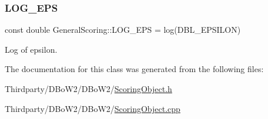 \subsubsection{\texorpdfstring{L\+O\+G\+\_\+\+E\+PS}{LOG\_EPS}}
{\footnotesize\ttfamily const double General\+Scoring\+::\+L\+O\+G\+\_\+\+E\+PS = log(D\+B\+L\+\_\+\+E\+P\+S\+I\+L\+ON)\hspace{0.3cm}{\ttfamily [static]}}



Log of epsilon. 



The documentation for this class was generated from the following files\+:\begin{DoxyCompactItemize}
\item 
Thirdparty/\+D\+Bo\+W2/\+D\+Bo\+W2/\mbox{\hyperlink{_scoring_object_8h}{Scoring\+Object.\+h}}\item 
Thirdparty/\+D\+Bo\+W2/\+D\+Bo\+W2/\mbox{\hyperlink{_scoring_object_8cpp}{Scoring\+Object.\+cpp}}\end{DoxyCompactItemize}
